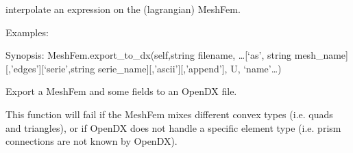 \documentclass[a4paper,11pt,english]{sphinxmanual}
\begin{document}
\begin{fulllineitems}
\begin{fulllineitems}
\end{fulllineitems}


\begin{fulllineitems}
\label{\detokenize{python/cmdref_MeshFem:getfem.MeshFem.eval}}
interpolate an expression on the (lagrangian) MeshFem.

Examples:

\begin{sphinxVerbatim}[commandchars=\\\{\}]
 
 

   
 
\end{sphinxVerbatim}

\end{fulllineitems}


\begin{fulllineitems}
\label{\detokenize{python/cmdref_MeshFem:getfem.MeshFem.export_to_dx}}
Synopsis: MeshFem.export\_to\_dx(self,string filename, …{[}‘as’, string mesh\_name{]}{[},’edges’{]}{[}‘serie’,string serie\_name{]}{[},’ascii’{]}{[},’append’{]}, U, ‘name’…)

Export a MeshFem and some fields to an OpenDX file.

This function will fail if the MeshFem mixes different convex types
(i.e. quads and triangles), or if OpenDX does not handle a specific
element type (i.e. prism connections are not known by OpenDX).


\end{fulllineitems}
\end{fulllineitems}
\end{document}
